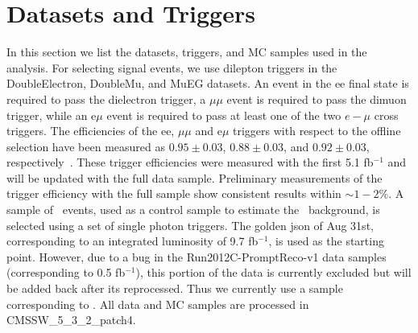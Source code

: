 \clearpage

\section{Datasets and Triggers}
\label{sec:datasets}

In this section we list the datasets, triggers, and MC samples used in the analysis. For selecting signal
events, we use dilepton triggers in the DoubleElectron, DoubleMu, and MuEG datasets. 
An event in the ee final state is required to pass the dielectron trigger, a 
$\mu\mu$ event is required to pass the dimuon trigger, while an e$\mu$ event is required to pass at least one 
of the two $e-\mu$ cross triggers. The efficiencies of the ee, $\mu\mu$ and e$\mu$ triggers with respect to the
offline selection have been measured as $0.95\pm0.03$, $0.88\pm0.03$, and $0.92\pm0.03$, respectively~\cite{ref:SSAN}.  
These trigger efficiencies were measured with the first 5.1 fb$^{-1}$ and will be updated with the full data sample. 
Preliminary measurements of the trigger efficiency with the full sample show consistent results within $\sim1-2$\%.
A sample of \gjets\ events, used as a control sample to estimate the \zjets\
background, is selected using a set of single photon triggers.
The golden json of Aug 31st, corresponding to an integrated luminosity of 9.7 fb$^{-1}$, is used as the starting point.
However, due to a bug in the Run2012C-PromptReco-v1 data samples (corresponding to 0.5 fb$^{-1}$), this portion of the data
is currently excluded but will be added back after its reprocessed. Thus we currently use a sample corresponding to \lumi.
All data and MC samples are processed in CMSSW\_5\_3\_2\_patch4.

